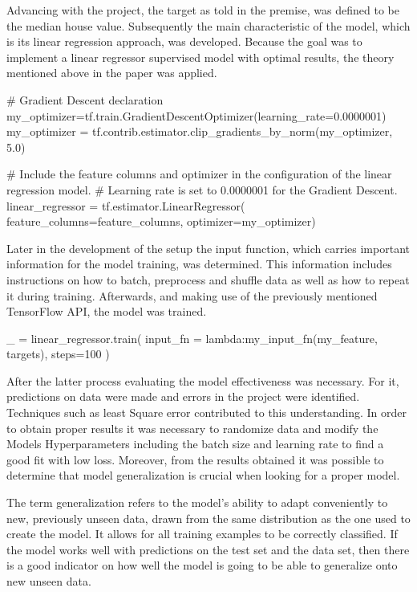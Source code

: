 Advancing with the project, the target as told in the premise, was defined to be the median house value.  Subsequently the main characteristic of the model,  which is its linear regression approach,  was developed. Because the goal was to implement a linear regressor supervised model with optimal results, the theory mentioned above in the paper was applied.

\begin{tensorflow}[caption={ads}]
# Gradient Descent declaration
my_optimizer=tf.train.GradientDescentOptimizer(learning_rate=0.0000001)
my_optimizer = tf.contrib.estimator.clip_gradients_by_norm(my_optimizer, 5.0)

# Include the feature columns and optimizer in the configuration of the  linear regression model.
# Learning rate is set to  0.0000001 for the Gradient Descent.
linear_regressor = tf.estimator.LinearRegressor( feature_columns=feature_columns, optimizer=my_optimizer)
\end{tensorflow}

Later in the development of the setup the input function, which carries important information for the model training, was determined. This information includes instructions on how to batch, preprocess and shuffle data as well as how to repeat it during training. Afterwards, and making use of the previously mentioned TensorFlow API, the model was trained.

\begin{tensorflow}[caption={ads}]
_ = linear_regressor.train(
    input_fn = lambda:my_input_fn(my_feature, targets),
    steps=100
)
\end{tensorflow}

After the latter process evaluating the model effectiveness was necessary. For it, predictions on data were made and errors in the project were identified. Techniques such as least Square error contributed to this understanding.  In order to obtain proper results it was necessary to randomize data and modify the Models Hyperparameters including the batch size and learning rate to find a good fit with low loss. Moreover, from the results obtained it was possible to determine that model generalization is crucial when looking for a proper model. 

The term generalization refers to the model’s ability to adapt conveniently to new, previously unseen data, drawn from the same distribution as the one used to create the model.  It allows for all training examples to be correctly classified. If the model works well with predictions on the test set and the data set, then there is a good indicator on how well the model is going to be able to generalize onto new unseen data.  

